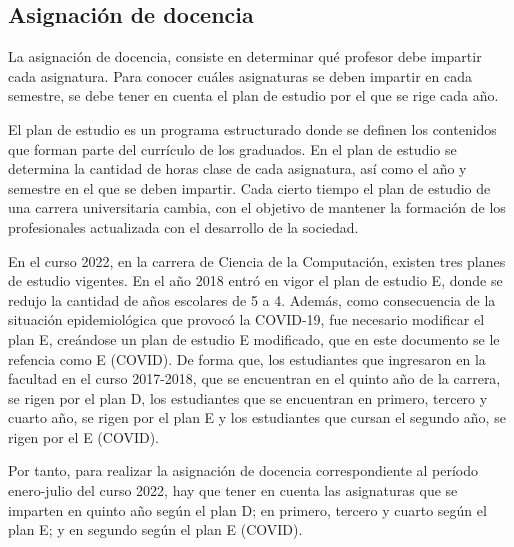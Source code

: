 





\subsection{Asignación de docencia}
La asignación de docencia, consiste en determinar qué profesor debe 
impartir cada asignatura. Para conocer cuáles asignaturas se deben impartir en 
cada semestre, se debe tener en cuenta el plan de estudio por el que se rige cada año.

El plan de estudio es un programa estructurado donde se definen los contenidos que forman parte del currículo de los 
graduados. En el plan de estudio se determina la cantidad de horas clase de cada asignatura, 
así como el año y semestre en el que se deben impartir. Cada cierto tiempo el plan de estudio de una carrera universitaria cambia,
con el objetivo de mantener la formación de los profesionales actualizada con el desarrollo de la 
sociedad.

En el curso 2022, en la carrera de Ciencia de la Computación, existen tres planes de 
estudio vigentes. En el año 2018 entró en vigor el plan de estudio E, donde 
se redujo la cantidad de años escolares de 5 a 4. Además, como consecuencia de la 
situación epidemiológica que provocó la COVID-19, fue necesario modificar el 
plan E, creándose un plan de estudio E modificado, que en este documento se le refencia como 
E (COVID). De forma que, los estudiantes que ingresaron en la facultad en 
el curso 2017-2018, que se encuentran en el quinto año de la carrera, se rigen por el plan D, 
los estudiantes que se encuentran en primero, tercero y cuarto año, se rigen por el plan E 
y los estudiantes que cursan el segundo año, se rigen por el E (COVID).

Por tanto, para realizar la asignación de docencia correspondiente al período enero-julio del 
curso 2022, hay que tener en cuenta las asignaturas que se imparten en quinto año 
según el plan D; en primero, tercero y cuarto según el plan E; y en segundo según el plan E (COVID).

